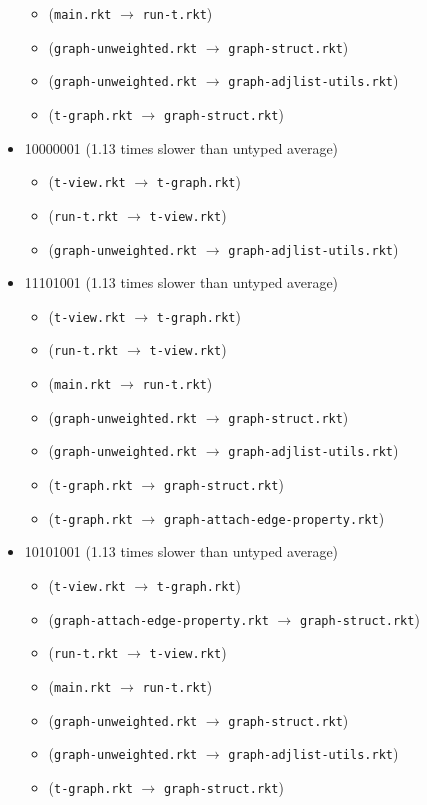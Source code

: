 \documentclass{article}
\newcommand{\mono}[1]{\texttt{#1}}
\begin{document}
\begin{itemize}
\begin{itemize}
  \item (\mono{main.rkt} $\rightarrow$ \mono{run-t.rkt})
  \item (\mono{graph-unweighted.rkt} $\rightarrow$ \mono{graph-struct.rkt})
  \item (\mono{graph-unweighted.rkt} $\rightarrow$ \mono{graph-adjlist-utils.rkt})
  \item (\mono{t-graph.rkt} $\rightarrow$ \mono{graph-struct.rkt})
  \end{itemize}
\item 10000001 (1.13 times slower than untyped average)
  \begin{itemize}
  \item (\mono{t-view.rkt} $\rightarrow$ \mono{t-graph.rkt})
  \item (\mono{run-t.rkt} $\rightarrow$ \mono{t-view.rkt})
  \item (\mono{graph-unweighted.rkt} $\rightarrow$ \mono{graph-adjlist-utils.rkt})
  \end{itemize}
\item 11101001 (1.13 times slower than untyped average)
  \begin{itemize}
  \item (\mono{t-view.rkt} $\rightarrow$ \mono{t-graph.rkt})
  \item (\mono{run-t.rkt} $\rightarrow$ \mono{t-view.rkt})
  \item (\mono{main.rkt} $\rightarrow$ \mono{run-t.rkt})
  \item (\mono{graph-unweighted.rkt} $\rightarrow$ \mono{graph-struct.rkt})
  \item (\mono{graph-unweighted.rkt} $\rightarrow$ \mono{graph-adjlist-utils.rkt})
  \item (\mono{t-graph.rkt} $\rightarrow$ \mono{graph-struct.rkt})
  \item (\mono{t-graph.rkt} $\rightarrow$ \mono{graph-attach-edge-property.rkt})
  \end{itemize}
\item 10101001 (1.13 times slower than untyped average)
  \begin{itemize}
  \item (\mono{t-view.rkt} $\rightarrow$ \mono{t-graph.rkt})
  \item (\mono{graph-attach-edge-property.rkt} $\rightarrow$ \mono{graph-struct.rkt})
  \item (\mono{run-t.rkt} $\rightarrow$ \mono{t-view.rkt})
  \item (\mono{main.rkt} $\rightarrow$ \mono{run-t.rkt})
  \item (\mono{graph-unweighted.rkt} $\rightarrow$ \mono{graph-struct.rkt})
  \item (\mono{graph-unweighted.rkt} $\rightarrow$ \mono{graph-adjlist-utils.rkt})
  \item (\mono{t-graph.rkt} $\rightarrow$ \mono{graph-struct.rkt})
  \end{itemize}
\end{itemize}
\end{document}
